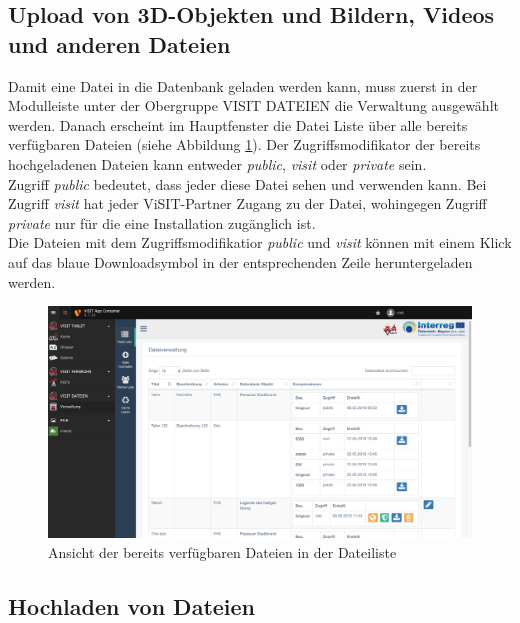 \subsection{Upload von 3D-Objekten und Bildern, Videos und anderen Dateien}

Damit eine Datei in die Datenbank geladen werden kann, muss zuerst in der Modulleiste unter der Obergruppe VISIT DATEIEN die \glqq Verwaltung\grqq{} ausgewählt werden. Danach erscheint im Hauptfenster die \glqq Datei Liste\grqq{} über alle bereits verfügbaren Dateien (siehe Abbildung \ref{img:dateiliste}). Der Zugriffsmodifikator der bereits hochgeladenen Dateien kann entweder \textit{public}, \textit{visit} oder \textit{private} sein.\\
Zugriff \textit{public} bedeutet, dass jeder diese Datei sehen und verwenden kann. Bei Zugriff \textit{visit} hat jeder ViSIT-Partner Zugang zu der Datei, wohingegen Zugriff \textit{private} nur für die eine Installation zugänglich ist.\\
Die Dateien mit dem Zugriffsmodifikatior \textit{public} und \textit{visit} können mit einem Klick auf das blaue Downloadsymbol in der entsprechenden Zeile heruntergeladen werden.

\begin{figure}[ht!]
\centering
\includegraphics[width=12cm]{Figures/paula/dateiverwaltung/dateiliste.png}
\caption{Ansicht der bereits verfügbaren Dateien in der Dateiliste}
\label{img:dateiliste}
\end{figure}

\subsection{Hochladen von Dateien}


